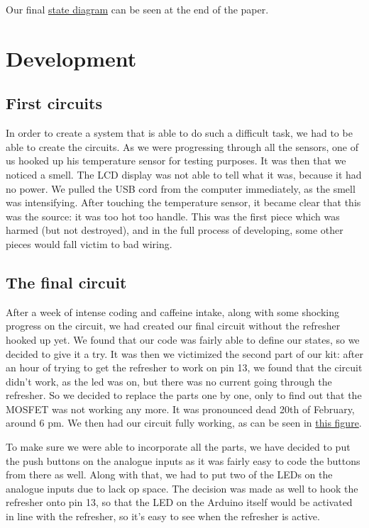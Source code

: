 \documentclass[a4paper, 11pt]{article}
\begin{document}
Our final \hyperref[fig:stateDia]{state diagram} can be seen at the end of the paper.

\section{Development}
\subsection{First circuits}
In order to create a system that is able to do such a difficult task, we had to be able to create the circuits. As we were progressing through all the sensors, one of us hooked up his temperature sensor for testing purposes. It was then that we noticed a smell. The LCD display was not able to tell what it was, because it had no power. We pulled the USB cord from the computer immediately, as the smell was intensifying. After touching the temperature sensor, it became clear that this was the source: it was too hot too handle. This was the first piece which was harmed (but not destroyed), and in the full process of developing, some other pieces would fall victim to bad wiring.

\subsection{The final circuit}
After a week of intense coding and caffeine intake, along with some shocking progress on the circuit, we had created our final circuit without the refresher hooked up yet. We found that our code was fairly able to define our states, so we decided to give it a try. It was then we victimized the second part of our kit: after an hour of trying to get the refresher to work on pin 13, we found that the circuit didn't work, as the led was on, but there was no current going through the refresher. So we decided to replace the parts one by one, only to find out that the MOSFET was not working any more. It was pronounced dead 20th of February, around 6 pm. We then had our circuit fully working, as can be seen in \hyperref[fig:circuit]{this figure}.

To make sure we were able to incorporate all the parts, we have decided to put the push buttons on the analogue inputs as it was fairly easy to code the buttons from there as well. Along with that, we had to put two of the LEDs on the analogue inputs due to lack op space. The decision was made as well to hook the refresher onto pin 13, so that the LED on the Arduino itself would be activated in line with the refresher, so it's easy to see when the refresher is active.
\end{document}
